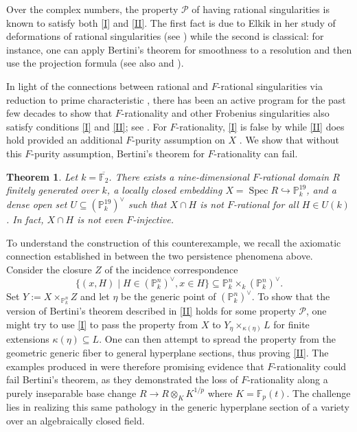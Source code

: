 \documentclass[reqno,11pt]{amsart}
\numberwithin{equation}{section}
\newtheorem{Theoremx}{Theorem}
\theoremstyle{definition}
\theoremstyle{definition}
\theoremstyle{definition}
\theoremstyle{remark}
\newcommand{\Spec}{\operatorname{Spec}}
\newcommand{\F}{\mathbb{F}}
\newcommand{\PP}{\mathbb{P}}
\newcommand{\cP}{\mathcal{P}}
\begin{document}
Over the complex numbers, the property $\cP$ of having rational singularities is known to satisfy both \ref{I} and \ref{II}. The first fact is due to Elkik in her study of deformations of rational singularities (see \cite[Th\'{e}or\`{e}me 5]{Elk78}) while the second is classical: for instance, one can apply Bertini's theorem for smoothness to a resolution and then use the projection formula (see also \cite{Kol97} and \cite[Lemmas 2 and 3]{Bri02}).

In light of the connections between rational and $F$-rational singularities via reduction to prime characteristic \cite{Har98,MS97,Smi97}, there has been an active program for the past few decades to show that $F$-rationality and other Frobenius singularities also satisfy conditions \ref{I} and \ref{II}; see \cite{Abe01,DM24,Ene00,Ene09,PSZ18,QGSS24,SZ13,DSPS25}. For $F$-rationality, \ref{I} is false by \cite{QGSS24} while \ref{II} does hold provided an additional $F$-purity assumption on $X$ \cite{DSPS25}. We show that without this $F$-purity assumption, Bertini's theorem for $F$-rationality can fail.
\begin{Theoremx}\label{mainthm:affine}
Let $k=\overline{\F_2}$. There exists a nine-dimensional $F$-rational domain $R$ finitely generated over $k$, a locally closed embedding $X=\Spec R\hookrightarrow \PP^{19}_k$, and a dense open set $U\subseteq(\PP^{19}_k)^\vee$ such that $X\cap H$ is not $F$-rational for all $H\in U(k)$. In fact, $X\cap H$ is not even $F$-injective.
\end{Theoremx}

To understand the construction of this counterexample, we recall the axiomatic connection established in \cite{CGM86} between the two persistence phenomena above. Consider the closure $Z$ of the incidence correspondence $$\{(x,H)\mid H\in (\PP^n_k)^\vee, x\in H\}\subseteq \PP^n_k\times_k (\PP^n_k)^\vee.$$ Set $Y:=X\times_{\PP^n_k} Z$ and let $\eta$ be the generic point of $(\PP^n_k)^\vee.$ To show that the version of Bertini's theorem described in \ref{II} holds for some property $\cP$, one might try to use \ref{I} to pass the property from $X$ to $Y_\eta\times_{\kappa(\eta)} L$ for finite extensions $\kappa(\eta)\subseteq L$. One can then attempt to spread the property from the geometric generic fiber to general hyperplane sections, thus proving \ref{II}. The examples produced in \cite{QGSS24} were therefore promising evidence that $F$-rationality could fail Bertini's theorem, as they demonstrated the loss of $F$-rationality along a purely inseparable base change $R\to R\otimes_K K^{1/p}$ where $K=\F_p(t)$. The challenge lies in realizing this same pathology in the generic hyperplane section of a variety over an algebraically closed field.
\end{document}
